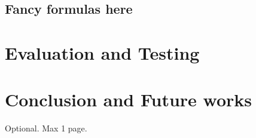 \documentclass[12pt,a4paper,openright,twoside]{book}
\begin{document}


\section{Fancy formulas here}

\chapter{Evaluation and Testing}
\label{chap:evaluation}

\chapter{Conclusion and Future works}
\label{chap:conclusion}


\backmatter

\nocite{*} %




\begin{acknowledgements} %
Optional. Max 1 page.
\end{acknowledgements}
\end{document}
